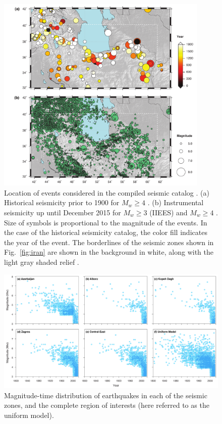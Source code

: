 
\begin{figure}[t]
	\centering
	\includegraphics[width=0.9\textwidth]{figures/pdf/figure-03}
	\caption{Location of events considered in the compiled seismic catalog . (a) Historical seismicity prior to 1900 for $M_w \geq 4$ \citep[after][]{Zare2014}. (b) Instrumental seismicity up until December 2015 for $M_w \geq 3$ (IIEES) and $M_w \geq 4$ \citep[after][]{Zare2014}. Size of symbols is proportional to the magnitude of the events. In the case of the historical seismicity catalog, the color fill indicates the year of the event. The borderlines of the seismic zones shown in Fig.~\ref{fig:iran} are shown in the background in white, along with the light gray shaded relief .}
	\label{fig:catalog}
\end{figure}

\begin{figure}[t]
	\centering
	\includegraphics[width=\textwidth]{figures/pdf/figure-04}
	\caption{Magnitude-time distribution of earthquakes in each of the seismic zones, and the complete region of interests (here referred to as the uniform model).}
	\label{fig:scatter}
\end{figure}

